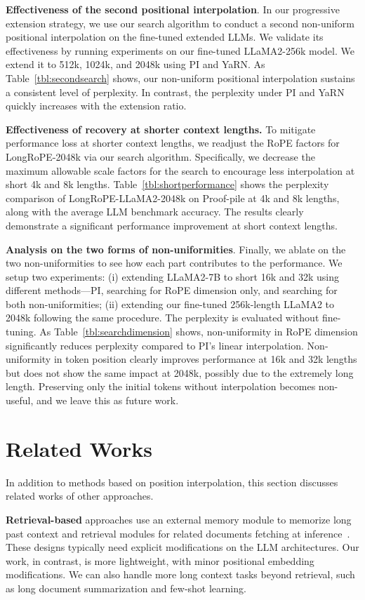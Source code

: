 \textbf{Effectiveness of the second positional interpolation}. In our progressive extension strategy, we use our search algorithm to conduct a second non-uniform positional interpolation on the fine-tuned extended LLMs. We validate its effectiveness by running experiments on our fine-tuned LLaMA2-256k model.  We extend it to 512k, 1024k, and 2048k using PI and YaRN. As Table~\ref{tbl:secondsearch} shows, our non-uniform positional interpolation sustains a consistent level of perplexity.  In contrast, the perplexity under PI and YaRN quickly increases with the extension ratio. 

\textbf{Effectiveness of recovery at shorter context lengths.} To mitigate performance loss at shorter context lengths, we readjust the RoPE factors for LongRoPE-2048k via our search algorithm. Specifically, we decrease the maximum allowable scale factors for the search to encourage less interpolation at short 4k and 8k lengths. 
 Table~\ref{tbl:shortperformance} shows the perplexity comparison of LongRoPE-LLaMA2-2048k on Proof-pile at 4k and 8k lengths, along with the average LLM benchmark accuracy.  The results clearly demonstrate a significant performance improvement at short context lengths. 

\textbf{Analysis on the two forms of non-uniformities}. Finally, we ablate on the two non-uniformities to see how each part contributes to the performance. We setup two experiments: (i) extending LLaMA2-7B to short 16k and 32k using different methods—PI, searching for RoPE dimension only, and searching for both non-uniformities; (ii) extending our fine-tuned 256k-length LLaMA2 to 2048k following the same procedure.  The perplexity is evaluated without fine-tuning. As Table~\ref{tbl:searchdimension} shows, non-uniformity in RoPE dimension significantly reduces perplexity compared to PI's linear interpolation. Non-uniformity in token position clearly improves performance at 16k and 32k lengths  but does not show the same impact at 2048k, possibly due to the extremely long length. Preserving only the initial tokens without interpolation becomes non-useful, and we leave this as future work.

\section{Related Works}

In addition to methods based on position interpolation, this section discusses related works of other approaches. 

\textbf{Retrieval-based} approaches  use an external memory module to memorize long past context and retrieval modules for related documents fetching at inference~\cite{longllama,wang2023augmenting,borgeaud2022improving}. These designs typically need explicit modifications on the LLM architectures. Our work, in contrast, is more lightweight, with minor positional embedding modifications. We can also handle more long context tasks beyond retrieval, such as long document summarization and few-shot learning. 

